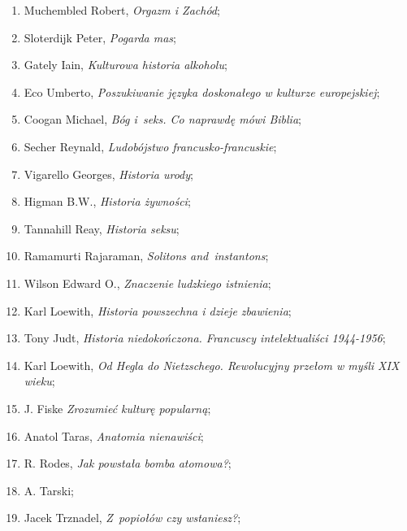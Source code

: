 \documentclass[a4paper,11pt]{article}
\begin{document}
\begin{enumerate}
\item Muchembled Robert, \textit{Orgazm i Zachód};

\item Sloterdijk Peter, \textit{Pogarda mas};

\item Gately Iain, \textit{Kulturowa historia alkoholu};

\item Eco Umberto, \textit{Poszukiwanie języka doskonałego w kulturze
    europejskiej};

\item Coogan Michael, \textit{Bóg i~seks. Co naprawdę mówi Biblia};

\item Secher Reynald, \textit{Ludobójstwo francusko-francuskie};

\item Vigarello Georges, \textit{Historia urody};

\item Higman B.W., \textit{Historia żywności};

\item Tannahill Reay, \textit{Historia seksu};

\item Ramamurti Rajaraman, \textit{Solitons and~instantons};

\item Wilson Edward O., \textit{Znaczenie ludzkiego istnienia};

\item Karl Loewith, \textit{Historia powszechna i dzieje zbawienia};

\item Tony Judt, \textit{Historia niedokończona. Francuscy
    intelektualiści 1944-1956};

\item Karl Loewith, \textit{Od Hegla do Nietzschego. Rewolucyjny przełom
    w myśli XIX wieku};

\item J. Fiske \textit{Zrozumieć kulturę popularną};

\item Anatol Taras, \textit{Anatomia nienawiści};

\item R. Rodes, \textit{Jak powstała bomba atomowa?};

\item A. Tarski;

\item Jacek Trznadel, \textit{Z~popiołów czy wstaniesz?};


\end{enumerate}
\end{document}
